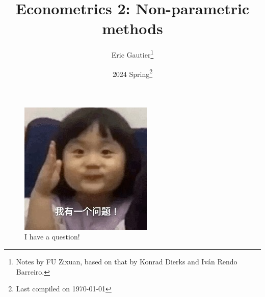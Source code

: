 \documentclass[12pt]{article}
\title{Econometrics 2: Non-parametric methods }
\author{Eric Gautier\thanks{Notes by FU Zixuan, based on that by Konrad Dierks and Iván Rendo Barreiro.}}
\date{2024 Spring\thanks{Last compiled on \today}}
\begin{document}
\maketitle

\begin{figure}[h]
    \centering
    \includegraphics{figures/ihaveaquestion.jpg}
    \caption*{I have a question!}
\end{figure}

\newpage
\tableofcontents
\newpage















\newpage
\end{document}
